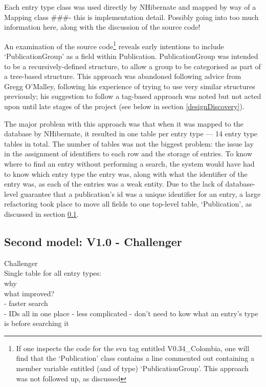 \documentclass{l4proj}
\newcommand{\revisit}{\#\#\#}
\begin{document}
Each entry type class was used directly by NHibernate and mapped by way of a Mapping class \revisit - this is implementation detail. Possibly going into too much information here, along with the discussion of the source code!

An examination of the source code\footnote{If one inspects the code for the \gls{svn} tag entitled V0.34\_Colombia, one will find that the `Publication' class contains a line commented out containing a member variable entitled (and of type) `PublicationGroup'.  This approach was not followed up, as discussed} reveals early intentions to include `PublicationGroup' as a field within Publication.  PublicationGroup was intended to be a recursively-defined structure, to allow a group to be categorised as part of a tree-based structure.  This approach was abandoned following advice from Gregg O'Malley, following his experience of trying to use very similar structures previously; his suggestion to follow a tag-based approach was noted but not acted upon until late stages of the project (see below in section \ref{designDiscovery}).

The major problem with this approach was that when it was mapped to the database by NHibernate, it resulted in one table per entry type --- 14 entry type tables in total.  The number of tables was not the biggest problem: the issue lay in the assignment of identifiers to each row and the storage of entries.  To know where to find an entry without performing a search, the system would have had to know which entry type the entry was, along with what the identifier of the entry was, as each of the entries was a weak entity.  Due to the lack of database-level guarantee that a publication's id was a unique identifier for an entry, a large refactoring took place to move all fields to one top-level table, `Publication', as discussed in section \ref{designChallenger}.

\subsection{Second model: V1.0 - Challenger}
\label{designChallenger}
Challenger\\
Single table for all entry types:\\
why\\
what improved?\\
 - faster search\\
 - IDs all in one place - less complicated - don't need to kow what an entry's type is before searching it\\
\end{document}
